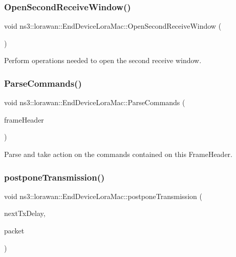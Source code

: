 \subsubsection{\texorpdfstring{Open\+Second\+Receive\+Window()}{OpenSecondReceiveWindow()}}
{\footnotesize\ttfamily void ns3\+::lorawan\+::\+End\+Device\+Lora\+Mac\+::\+Open\+Second\+Receive\+Window (\begin{DoxyParamCaption}\item[{void}]{ }\end{DoxyParamCaption})}

Perform operations needed to open the second receive window. \mbox{\label{classns3_1_1lorawan_1_1EndDeviceLoraMac_a7ca5d196ac64e1dfdddd8738f8d1cfbb}} 
\subsubsection{\texorpdfstring{Parse\+Commands()}{ParseCommands()}}
{\footnotesize\ttfamily void ns3\+::lorawan\+::\+End\+Device\+Lora\+Mac\+::\+Parse\+Commands (\begin{DoxyParamCaption}\item[{\hyperlink{classns3_1_1lorawan_1_1LoraFrameHeader}{Lora\+Frame\+Header}}]{frame\+Header }\end{DoxyParamCaption})}

Parse and take action on the commands contained on this Frame\+Header. \mbox{\label{classns3_1_1lorawan_1_1EndDeviceLoraMac_a52344bd799bd6c0bc4032b0137f1a1c4}} 
\subsubsection{\texorpdfstring{postpone\+Transmission()}{postponeTransmission()}}
{\footnotesize\ttfamily void ns3\+::lorawan\+::\+End\+Device\+Lora\+Mac\+::postpone\+Transmission (\begin{DoxyParamCaption}\item[{Time}]{next\+Tx\+Delay,  }\item[{Ptr$<$ Packet $>$}]{packet }\end{DoxyParamCaption})\hspace{0.3cm}{\ttfamily [virtual]}}

